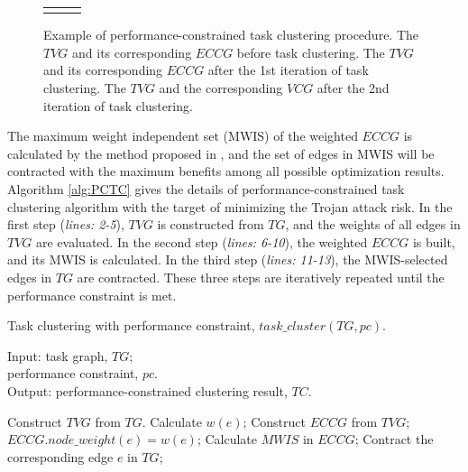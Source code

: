 \documentclass[10pt,journal]{IEEEtran}
\begin{document}
\begin{figure}[!t]
\begin{tabular}{ccc}
{}
\end{tabular}
\caption{Example of performance-constrained task clustering procedure.  The $TVG$ and its corresponding $ECCG$ before task clustering.  The $TVG$ and its corresponding $ECCG$ after the 1st iteration of task clustering.  The $TVG$ and the corresponding $VCG$ after the 2nd iteration of task clustering.}
\label{fig:TC}
\end{figure}



The maximum weight independent set (MWIS) of the weighted $ECCG$ is calculated by the method proposed in \cite{conference:LC}, and the set of edges in MWIS will be contracted with the maximum benefits among all possible optimization results. Algorithm \ref{alg:PCTC} gives the details of performance-constrained task clustering algorithm with the target of minimizing the Trojan attack risk. In the first step (\textit{lines: 2-5}), $TVG$ is constructed from $TG$, and the weights of all edges in $TVG$ are evaluated. In the second step (\textit{lines: 6-10}), the weighted $ECCG$ is built, and its MWIS is calculated. In the third step (\textit{lines: 11-13}), the MWIS-selected edges in $TG$ are contracted. These three steps are iteratively repeated until the performance constraint is met.

\begin{algorithm}[!h]
\caption{Task clustering with performance constraint, $task\_cluster(TG, pc)$.}
\label{alg:PCTC}
\begin{flushleft}
{Input:}
task graph, $TG$;\\
\hspace*{2.8em}performance constraint, $pc$.\\
{Output:} performance-constrained clustering result, $TC$.
\end{flushleft}
\begin{algorithmic}[1]
\STATE Construct $TVG$ from $TG$.
\STATE Calculate $w(e)$;
\ENDFOR
\STATE Construct $ECCG$ from $TVG$;
\STATE $ECCG.node\_weight(e)=w(e)$;
\ENDFOR
\STATE Calculate $MWIS$ in $ECCG$;
    \STATE Contract the corresponding edge $e$ in $TG$;
\ENDFOR
\ENDWHILE
\end{algorithmic}
\end{algorithm}
\end{document}
